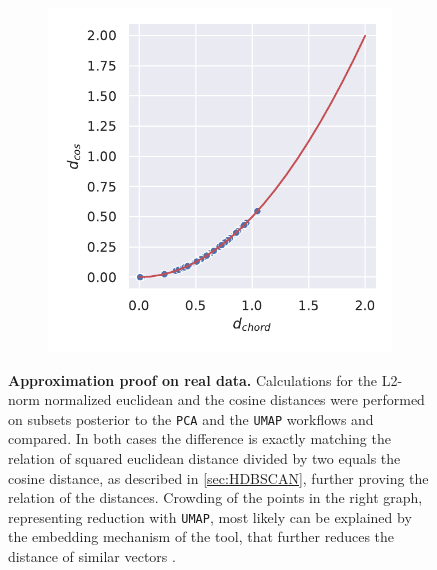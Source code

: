 \begin{figure}[!hbt]
\begin{subfigure}[b]{0.475\textwidth}
        \label{subfig:Normalisation_UMAP}            \includegraphics[width=\textwidth]{UMAP/Difference_Distance_Calculation.pdf}
    \end{subfigure}
    \caption[Approximation proof on real data]{\textbf{Approximation proof on real data.} Calculations for the L2-norm normalized euclidean and the cosine distances were performed on subsets posterior to the \texttt{PCA} and the \texttt{UMAP} workflows and compared. In both cases the difference is exactly matching the relation of squared euclidean distance divided by two equals the cosine distance, as described in \autoref{sec:HDBSCAN}, further proving the relation of the distances. Crowding of the points in the right graph, representing reduction with \texttt{UMAP}, most likely can be explained by the embedding mechanism of the tool, that further reduces the distance of similar vectors \autocite{mcinnes_umap_2020}.}
    \label{fig:Normalisation_Methods}
\end{figure}

\vspace{1em}

